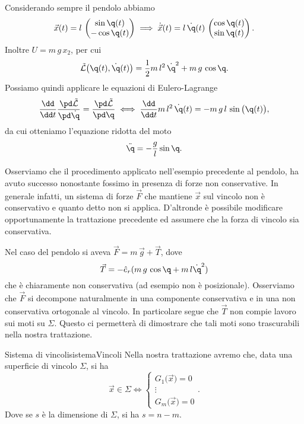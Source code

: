\begin{ese}
	Considerando sempre il pendolo abbiamo
	\[
		\vec{x}(t) = l\,\begin{pmatrix}\sin\q(t)\\-\cos\q(t)\end{pmatrix} \implies \dot{\vec{x}}(t) = l\,\dot{\q}(t)\,\begin{pmatrix}\cos\q(t)\\\sin\q(t)\end{pmatrix}.
	\]
	Inoltre \(U=m\,g\,x_2\), per cui
	\[
		\tilde{\mathcal{L}}\big(\q(t),\dot{\q}(t)\big) = \frac{1}{2}m\,l^2\,\dot{\q}^2 + m\,g\,\cos\q.
	\]
	Possiamo quindi applicare le equazioni di Eulero-Lagrange
	\[
		\frac{\dd}{\dd t}\frac{\pd\tilde{\mathcal{L}}}{\pd\dot{\q}} = \frac{\pd\tilde{\mathcal{L}}}{\pd\q} \iff \frac{\dd}{\dd t} m\,l^2\,\dot{\q}(t) = -m\,g\,l\,\sin\big(\q(t)\big),
	\]
	da cui otteniamo l'equazione ridotta del moto
	\[
		\ddot{\q} = -\frac{g}{l}\sin\q.
	\]
\end{ese}
\noindent
Osserviamo che il procedimento applicato nell'esempio precedente al pendolo, ha avuto successo nonostante fossimo in presenza di forze non conservative. In generale infatti, un sistema di forze \(\vec{F}\) che mantiene \(\vec{x}\) sul vincolo non è conservativo e quanto detto non si applica.
D'altronde è possibile modificare opportunamente la trattazione precedente ed assumere che la forza di vincolo sia conservativa.

Nel caso del pendolo si aveva \(\vec{F}=m\,\vec{g}+\vec{T}\), dove
\[
	\vec{T} = -\hat{e}_r(m\,g\,\cos\q+m\,l\dot{\q}^2)
\]
che è chiaramente non conservativa (ad esempio non è posizionale).
Osserviamo che \(\vec{F}\) si decompone naturalmente in una componente conservativa e in una non conservativa ortogonale al vincolo.
In particolare segue che \(\vec{T}\) non compie lavoro sui moti su \(\Sigma\). Questo ci permetterà di dimostrare che tali moti sono trascurabili nella nostra trattazione.

\begin{defn}{Sistema di vincoli}{sistemaVincoli}
	Nella nostra trattazione avremo che, data una superficie di vincolo \(\Sigma\), si ha
	\[
		\vec{x}\in\Sigma \iff 	\begin{cases}
			G_1\big(\vec{x}\big) = 0 \\
			\vdots                   \\
			G_m\big(\vec{x}\big) = 0
		\end{cases}.
	\]
	Dove se \(s\) è la dimensione di \(\Sigma\), si ha \(s=n-m\).
\end{defn}

